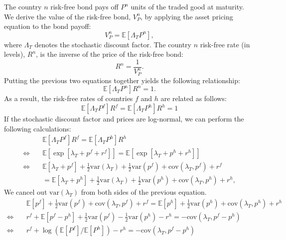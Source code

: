 The country $n$ risk-free bond pays off $P^n$ units of the traded good
at maturity. We derive the value of the risk-free bond, $V^n_P$, by
applying the asset pricing equation to the bond payoff:
\begin{equation*}
  V^n_P = \mathbb{E}\left[\Lambda_{T} P^n
  \right],
\end{equation*}
where $\Lambda_{T}$ denotes the stochastic discount factor. The
country $n$ risk-free rate (in levels), $R^n$, is the inverse of the
price of the risk-free bond:
\begin{equation*}
  R^n = \frac{1}{V^n_P}.
\end{equation*}
Putting the previous two equations together yields the following
relationship:
\begin{equation*}
  \mathbb{E}\left[ \Lambda_{T} P^n \right] R^n = 1.
\end{equation*}
As a result, the risk-free rates of countries $f$ and $h$ are related
as follows:
\begin{equation*}
  \mathbb{E}\left[\Lambda_{T} P^f \right] R^f
  = \mathbb{E}\left[\Lambda_{T} P^h \right] R^h = 1
\end{equation*} 
If the stochastic discount factor and prices are log-normal, we can
perform the following calculations:
\begin{align*}
  & \mathbb{E}\left[\Lambda_{T} P^f \right] R^f
    = \mathbb{E}\left[\Lambda_{T} P^h \right] R^h \\
  \Leftrightarrow\quad
  & \mathbb{E}\left[\exp\left[ \lambda_{T} + p^f + r^f \right]\right]
    = \mathbb{E}\left[\exp\left[\lambda_{T} + p^h + r^h \right]\right] \\
  \Leftrightarrow\quad
  & \mathbb{E}\left[\lambda_{T} + p^f\right] + \frac{1}{2}\text{var}\left(\lambda_{T}\right) + 
    \frac{1}{2}\text{var}\left(p^f\right) + \text{cov}\left(\lambda_{T}, p^f\right) + r^f \\
  & = 
    \mathbb{E}\left[\lambda_{T}+ p^h\right] + \frac{1}{2}\text{var}\left(\lambda_{T}\right)+ 
    \frac{1}{2}\text{var}\left(p^h\right) + \text{cov}\left(\lambda_{T}, p^h\right)+r^h,
\end{align*}
We cancel out $\text{var}\left( \lambda_{T} \right)$ from both sides
of the previous equation.
\begin{align*}
  &\mathbb{E}\left[p^f\right]+\frac{1}{2}\text{var}\left(p^f\right) + \text{cov}\left(\lambda_T, p^f\right)+r^f
    = \mathbb{E}\left[p^h\right]+\frac{1}{2}\text{var}\left(p^h\right)+\text{cov}\left(\lambda_T,p^h\right)+r^h
  \\      \Leftrightarrow \quad
  & r^f+\mathbb{E}\left[p^f-p^h\right]+\frac{1}{2}\text{var}\left(p^f\right)-\frac{1}{2}\text{var}\left(p^h\right)-r^h = -\text{cov}\left(\lambda_T,p^f-p^h\right)\\   
  \Leftrightarrow\quad
  &r^f+\log\left(\mathbb{E}\left[P^f\right]/\mathbb{E}\left[P^h\right]\right)-r^h = -\text{cov}\left(\lambda_T,p^f-p^h\right)
\end{align*}
